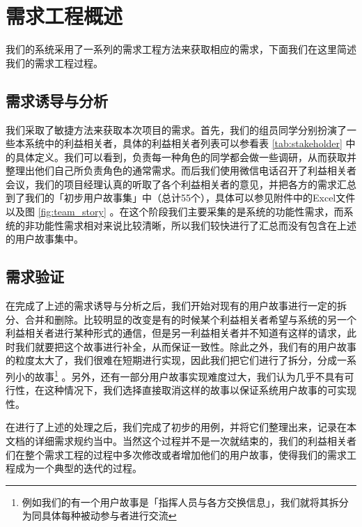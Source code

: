 \documentclass{ctexrep}
\begin{document}
\section{需求工程概述}
我们的系统采用了一系列的需求工程方法来获取相应的需求，下面我们在这里简述我们的需求工程过程。
\subsection{需求诱导与分析}
我们采取了敏捷方法来获取本次项目的需求。首先，我们的组员同学分别扮演了一些本系统中的利益相关者，具体的利益相关者列表可以参看表 \ref{tab:stakeholder} 中的具体定义。我们可以看到，负责每一种角色的同学都会做一些调研，从而获取并整理出他们自己所负责角色的通常需求。而后我们使用微信电话召开了利益相关者会议，我们的项目经理认真的听取了各个利益相关者的意见，并把各方的需求汇总到了我们的「初步用户故事集」中（总计55个），具体可以参见附件中的Excel文件以及图 \ref{fig:team_story} 。在这个阶段我们主要采集的是系统的功能性需求，而系统的非功能性需求相对来说比较清晰，所以我们较快进行了汇总而没有包含在上述的用户故事集中。
\subsection{需求验证}
在完成了上述的需求诱导与分析之后，我们开始对现有的用户故事进行一定的拆分、合并和删除。比较明显的改变是有的时候某个利益相关者希望与系统的另一个利益相关者进行某种形式的通信，但是另一利益相关者并不知道有这样的请求，此时我们就要把这个故事进行补全，从而保证一致性。除此之外，我们有的用户故事的粒度太大了，我们很难在短期进行实现，因此我们把它们进行了拆分，分成一系列小的故事\footnote{例如我们的有一个用户故事是「指挥人员与各方交换信息」，我们就将其拆分为同具体每种被动参与者进行交流} 。另外，还有一部分用户故事实现难度过大，我们认为几乎不具有可行性，在这种情况下，我们选择直接取消这样的故事以保证系统用户故事的可实现性。

在进行了上述的处理之后，我们完成了初步的用例，并将它们整理出来，记录在本文档的详细需求规约当中。当然这个过程并不是一次就结束的，我们的利益相关者们在整个需求工程的过程中多次修改或者增加他们的用户故事，使得我们的需求工程成为一个典型的迭代的过程。
\end{document}
